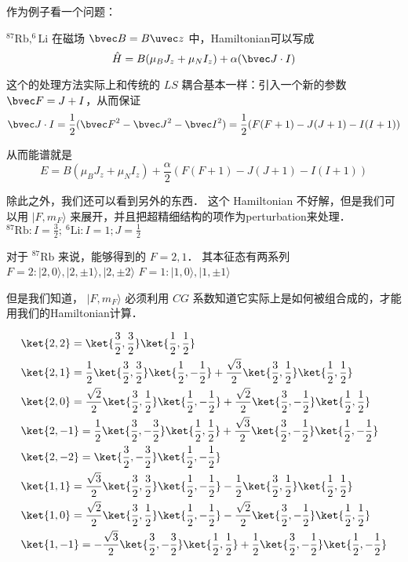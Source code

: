 作为例子看一个问题：

$^{87}{\text{Rb}}, ^6{\text{Li}}$ 在磁场 $\bvec B = B\uvec z$ 中，Hamiltonian可以写成
\begin{equation}
\hat{H} = B(\mu_B J_z+\mu_N I_z)+\alpha({\bvec J\cdot I})
\end{equation}

这个的处理方法实际上和传统的 $LS$ 耦合基本一样：引入一个新的参数 ${\bvec F = J+I}$，从而保证
\begin{equation}
{\bvec J\cdot I} = \frac{1}{2}({\bvec F}^2 - {\bvec J}^2 - {\bvec I}^2) = \frac{1}{2} (F(F+1) - J(J+1) - I(I+1))
\end{equation}

从而能谱就是
\begin{equation}
E = B(\mu_B J_z+\mu_N I_z)+\frac{\alpha}{2} (F(F+1) - J(J+1) - I(I+1))
\end{equation}

除此之外，我们还可以看到另外的东西． 这个 Hamiltonian 不好解，但是我们可以用 $|F,m_F\rangle$ 来展开，并且把超精细结构的项作为perturbation来处理． $^{87}{\text{Rb}}: I = \frac{3}{2};\ ^6{\text{Li}}: I = 1; J = \frac{1}{2}$

对于 $^{87}{\text{Rb}}$ 来说，能够得到的 $F=2,1$． 其本征态有两系列
$F=2:|2,0\rangle,|2,\pm1\rangle,|2,\pm2\rangle$
$F=1:|1,0\rangle,|1,\pm1\rangle$

但是我们知道， $|F,m_F\rangle$ 必须利用 $CG$ 系数知道它实际上是如何被组合成的，才能用我们的Hamiltonian计算．

\begin{align}
&\ket{2,2} = \ket{\frac{3}{2},\frac{3}{2}} \ket{\frac{1}{2},\frac{1}{2}}\\
&\ket{2,1} = \frac{1}{2} \ket{\frac{3}{2},\frac{3}{2}} \ket{\frac{1}{2},-\frac{1}{2}} + \frac{\sqrt{3}}{2} \ket{\frac{3}{2},\frac{1}{2}} \ket{\frac{1}{2},\frac{1}{2}}\\
& \ket{2,0} = \frac{\sqrt{2}}{2} \ket{\frac{3}{2},\frac{1}{2}} \ket{\frac{1}{2},-\frac{1}{2}} + \frac{\sqrt{2}}{2} \ket{\frac{3}{2},-\frac{1}{2}} \ket{\frac{1}{2},\frac{1}{2}}\\
&\ket{2,-1} = \frac{1}{2} \ket{\frac{3}{2},-\frac{3}{2}} \ket{\frac{1}{2},\frac{1}{2}} + \frac{\sqrt{3}}{2} \ket{\frac{3}{2},-\frac{1}{2}} \ket{\frac{1}{2},-\frac{1}{2}}\\
& \ket{2,-2} = \ket{\frac{3}{2},-\frac{3}{2}} \ket{\frac{1}{2},-\frac{1}{2}}\\
&\ket{1,1} = \frac{\sqrt{3}}{2} \ket{\frac{3}{2},\frac{3}{2}} \ket{\frac{1}{2},-\frac{1}{2}} - \frac{1}{2} \ket{\frac{3}{2},\frac{1}{2}} \ket{\frac{1}{2},\frac{1}{2}}\\
&\ket{1,0} = \frac{\sqrt{2}}{2} \ket{\frac{3}{2},\frac{1}{2}} \ket{\frac{1}{2},-\frac{1}{2}} - \frac{\sqrt{2}}{2} \ket{\frac{3}{2},-\frac{1}{2}} \ket{\frac{1}{2},\frac{1}{2}}\\
&\ket{1,-1} = -\frac{\sqrt{3}}{2} \ket{\frac{3}{2},-\frac{3}{2}} \ket{\frac{1}{2},\frac{1}{2}} + \frac{1}{2} \ket{\frac{3}{2},-\frac{1}{2}} \ket{\frac{1}{2},-\frac{1}{2}}
\end{align}

